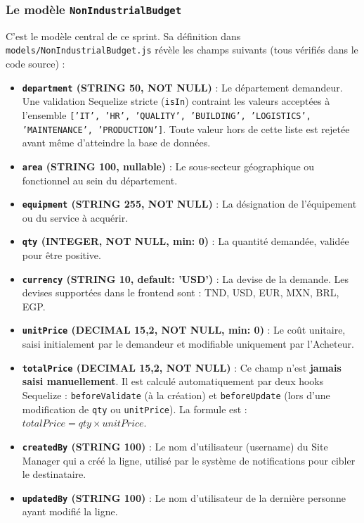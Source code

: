 \subsubsection{Le modèle \texttt{NonIndustrialBudget}}
C'est le modèle central de ce sprint. Sa définition dans \texttt{models/NonIndustrialBudget.js} révèle les champs suivants (tous vérifiés dans le code source) :
\begin{itemize}
    \item \textbf{\texttt{department} (STRING 50, NOT NULL)} : Le département demandeur. Une validation Sequelize stricte (\texttt{isIn}) contraint les valeurs acceptées à l'ensemble \texttt{['IT', 'HR', 'QUALITY', 'BUILDING', 'LOGISTICS', 'MAINTENANCE', 'PRODUCTION']}. Toute valeur hors de cette liste est rejetée avant même d'atteindre la base de données.
    \item \textbf{\texttt{area} (STRING 100, nullable)} : Le sous-secteur géographique ou fonctionnel au sein du département.
    \item \textbf{\texttt{equipment} (STRING 255, NOT NULL)} : La désignation de l'équipement ou du service à acquérir.
    \item \textbf{\texttt{qty} (INTEGER, NOT NULL, min: 0)} : La quantité demandée, validée pour être positive.
    \item \textbf{\texttt{currency} (STRING 10, default: 'USD')} : La devise de la demande. Les devises supportées dans le frontend sont : TND, USD, EUR, MXN, BRL, EGP.
    \item \textbf{\texttt{unitPrice} (DECIMAL 15,2, NOT NULL, min: 0)} : Le coût unitaire, saisi initialement par le demandeur et modifiable uniquement par l'Acheteur.
    \item \textbf{\texttt{totalPrice} (DECIMAL 15,2, NOT NULL)} : Ce champ n'est \textbf{jamais saisi manuellement}. Il est calculé automatiquement par deux hooks Sequelize : \texttt{beforeValidate} (à la création) et \texttt{beforeUpdate} (lors d'une modification de \texttt{qty} ou \texttt{unitPrice}). La formule est : $totalPrice = qty \times unitPrice$.
    \item \textbf{\texttt{createdBy} (STRING 100)} : Le nom d'utilisateur (username) du Site Manager qui a créé la ligne, utilisé par le système de notifications pour cibler le destinataire.
    \item \textbf{\texttt{updatedBy} (STRING 100)} : Le nom d'utilisateur de la dernière personne ayant modifié la ligne.
\end{itemize}

